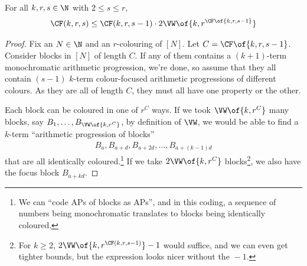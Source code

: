 \begin{boxlemma}\label{Ch6:Lemma:CF_Recursion}
    For all $k, r, s \in \N$ with $2 \leq s \leq r$,
    \begin{align*}
        \CF(k, r, s)
        \leq \CF(k, r, s - 1) \cdot 2 \VW\of{k, r^{\CF\of{k, r, s - 1}}}
    \end{align*}
\end{boxlemma}
\begin{proof}
    Fix an $N \in \N$ and an $r$-colouring of $[N]$. Let $C = \CF\of{k, r, s - 1}$. Consider blocks in $[N]$ of length $C$. If any of them contains a $(k + 1)$-term monochromatic arithmetic progression, we're done, so assume that they all contain $(s - 1)$ $k$-term colour-focused arithmetic progressions of different colours. As they are all of length $C$, they must all have one property or the other.
    
    Each block can be coloured in one of $r^C$ ways. If we took $\VW\of{k, r^C}$ many blocks, say $B_1, \ldots, B_{\VW\of{k, r^C}}$, by definition of $\VW$, we would be able to find a $k$-term ``arithmetic progression of blocks''
    \begin{align*}
        B_{a}, B_{a + d}, B_{a + 2d}, \ldots, B_{a + (k - 1)d}
    \end{align*}
    that are all identically coloured.\footnote{We can ``code APs of blocks as APs'', and in this coding, a sequence of numbers being monochromatic translates to blocks being identically coloured.} If we take $2\VW\of{k, r^C}$ blocks\footnote{For $k \geq 2$, $2\VW\of{k, r^{\CF(k, r, s - 1)}} - 1$ would suffice, and we can even get tighter bounds, but the expression looks nicer without the ${} - 1$.}, we also have the focus block $B_{a + kd}$.


\end{proof}
